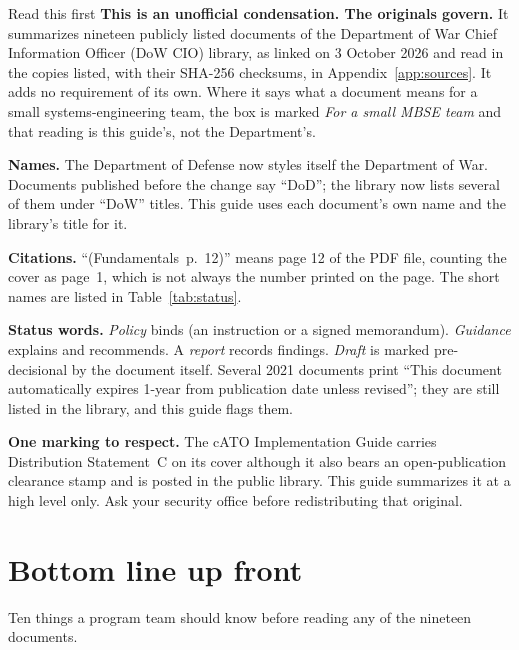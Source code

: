 \documentclass[11pt,letterpaper,twoside,openany]{memoir}
\newcommand{\pg}[2]{{\small(#1~p.~#2)}}          %
\begin{document}
\begin{boxwarning}{Read this first}
\textbf{This is an unofficial condensation. The originals govern.} It summarizes nineteen publicly listed documents of
the Department of War Chief Information Officer (DoW CIO) library, as linked on 3 October 2026 and read in the copies
listed, with their SHA-256 checksums, in Appendix~\ref{app:sources}. It adds no requirement of its own. Where it says
what a document means for a small systems-engineering team, the box is marked \emph{For a small MBSE team} and that
reading is this guide's, not the Department's.

\textbf{Names.} The Department of Defense now styles itself the Department of War. Documents published before the
change say ``DoD''; the library now lists several of them under ``DoW'' titles. This guide uses each document's own
name and the library's title for it.

\textbf{Citations.} ``\pg{Fundamentals}{12}'' means page 12 of the PDF file, counting the cover as page~1, which is
not always the number printed on the page. The short names are listed in Table~\ref{tab:status}.

\textbf{Status words.} \emph{Policy} binds (an instruction or a signed memorandum). \emph{Guidance} explains and
recommends. A \emph{report} records findings. \emph{Draft} is marked pre-decisional by the document itself. Several
2021 documents print ``This document automatically expires 1-year from publication date unless revised''; they are
still listed in the library, and this guide flags them.

\textbf{One marking to respect.} The cATO Implementation Guide carries Distribution Statement~C on its cover although it
also bears an open-publication clearance stamp and is posted in the public library. This guide summarizes it at a high
level only. Ask your security office before redistributing that original.
\end{boxwarning}
\vspace*{\fill}
\clearpage
\tableofcontents*
\clearpage
\mainmatter

\chapter{Bottom line up front}\label{ch:bluf}
\vspace{-1\onelineskip}
Ten things a program team should know before reading any of the nineteen documents.
\end{document}
